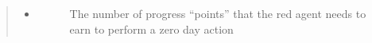 \documentclass[letterpaper,10pt,english]{sphinxmanual}
\begin{document}
\begin{itemize}
\begin{description}
\begin{itemize}
\begin{quote}
\begin{itemize}
\begin{description}
\end{description}

\item {} \begin{description}
\item[{}] \leavevmode
\sphinxAtStartPar
The number of progress “points” that the red agent needs to earn to perform a zero day action

\end{description}

\end{itemize}
\end{quote}

\end{itemize}

\end{description}

\end{itemize}
\end{document}
